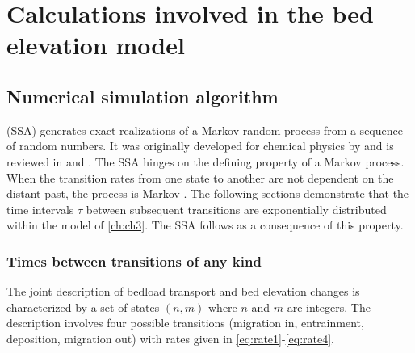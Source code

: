 

\chapter{Calculations involved in the bed elevation model}
\label{ch:gill}
\section{Numerical simulation algorithm}
\DIFdelbegin %

\DIFdelend \DIFaddbegin \label{sec:arr}
\DIFaddend (SSA) generates exact realizations of a Markov random process from a sequence of random numbers.
It was originally developed for chemical physics by \citet{Gillespie1977} and is reviewed in \citet{Gillespie1991} and \citet{Gillespie2007}.
The SSA hinges on the defining property of a Markov process. When the transition rates from one state to another are not dependent on the distant past, the process is Markov \DIFdelbegin {}\DIFdelend \DIFaddbegin {}\DIFaddend .
The following sections demonstrate that the time intervals $\tau$ between subsequent transitions are exponentially distributed within the model of \DIFdelbegin {}\DIFdelend \DIFaddbegin {}\DIFaddend \ref{ch:ch3}. The SSA follows as a consequence of this property.

\subsection{Times between transitions of any kind}
The joint description of bedload transport and bed elevation changes is characterized by a set of states $(n,m)$ where $n$ and $m$ are integers.
The description involves four possible transitions (migration in, entrainment, deposition, migration out) with rates given in \DIFdelbegin {}\DIFdelend \DIFaddbegin {}\DIFaddend \ref{eq:rate1}-\ref{eq:rate4}\DIFdelbegin \DIFdel{)}\DIFdelend .

